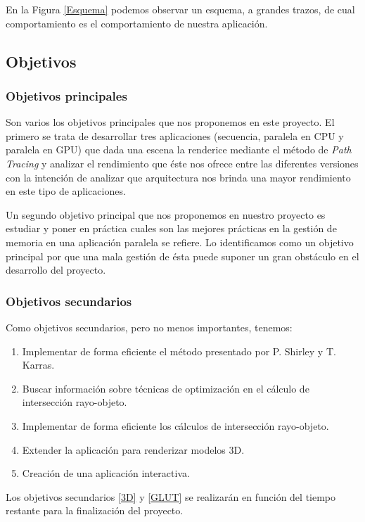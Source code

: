 \documentclass[titlepage,12pt]{report}
\begin{document}
En la Figura \ref{Esquema} podemos observar un esquema, a grandes trazos, de cual comportamiento es el comportamiento de nuestra aplicación.

\subsection{Objetivos}

\subsubsection{Objetivos principales}

Son varios los objetivos principales que nos proponemos en este proyecto. El primero se trata de desarrollar tres aplicaciones (secuencia, paralela en CPU y paralela en GPU) que dada una escena la renderice mediante el método de \textit{Path Tracing} y analizar el rendimiento que éste nos ofrece entre las diferentes versiones con la intención de analizar que arquitectura nos brinda una mayor rendimiento en este tipo de aplicaciones.

Un segundo objetivo principal que nos proponemos en nuestro proyecto es estudiar y poner en práctica cuales son las mejores prácticas en la gestión de memoria en una aplicación paralela se refiere. Lo identificamos como un objetivo principal por que una mala gestión de ésta puede suponer un gran obstáculo en el desarrollo del proyecto.

\subsubsection{Objetivos secundarios}

Como objetivos secundarios, pero no menos importantes, tenemos:

\begin{enumerate}
	\item Implementar de forma eficiente el método presentado por P. Shirley y T. Karras.
	\item Buscar información sobre técnicas de optimización en el cálculo de intersección rayo-objeto.
	\item Implementar de forma eficiente los cálculos de intersección rayo-objeto.
	\item \label{3D} Extender la aplicación para renderizar modelos 3D.
	\item \label{GLUT} Creación de una aplicación interactiva.
\end{enumerate}

Los objetivos secundarios \ref{3D} y \ref{GLUT} se realizarán en función del tiempo restante para la finalización del proyecto.
\end{document}
